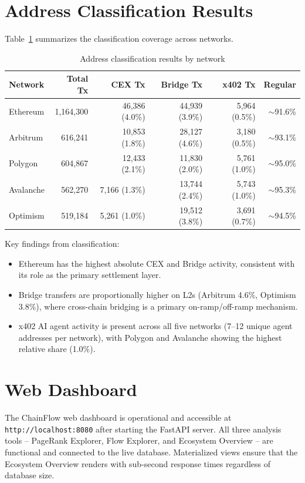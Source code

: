 \documentclass[a4paper,12pt]{report}
\begin{document}
\section{Address Classification Results}

Table~\ref{tab:classification} summarizes the classification coverage across networks.

\begin{table}[H]
\centering
\caption{Address classification results by network}
\label{tab:classification}
\begin{tabular}{|l|r|r|r|r|r|}
\hline
\textbf{Network} & \textbf{Total Tx} & \textbf{CEX Tx} & \textbf{Bridge Tx} & \textbf{x402 Tx} & \textbf{Regular} \\\hline
Ethereum  & 1,164,300 & 46,386 (4.0\%) & 44,939 (3.9\%) & 5,964 (0.5\%) & $\sim$91.6\% \\\hline
Arbitrum  &   616,241 & 10,853 (1.8\%) & 28,127 (4.6\%) & 3,180 (0.5\%) & $\sim$93.1\% \\\hline
Polygon   &   604,867 & 12,433 (2.1\%) & 11,830 (2.0\%) & 5,761 (1.0\%) & $\sim$95.0\% \\\hline
Avalanche &   562,270 &  7,166 (1.3\%) & 13,744 (2.4\%) & 5,743 (1.0\%) & $\sim$95.3\% \\\hline
Optimism  &   519,184 &  5,261 (1.0\%) & 19,512 (3.8\%) & 3,691 (0.7\%) & $\sim$94.5\% \\\hline
\end{tabular}
\end{table}

Key findings from classification:
\begin{itemize}
\item Ethereum has the highest absolute CEX and Bridge activity, consistent with its role as the
primary settlement layer.
\item Bridge transfers are proportionally higher on L2s (Arbitrum 4.6\%, Optimism 3.8\%), where
cross-chain bridging is a primary on-ramp/off-ramp mechanism.
\item x402 AI agent activity is present across all five networks (7--12 unique agent addresses
per network), with Polygon and Avalanche showing the highest relative share (1.0\%).
\end{itemize}

\section{Web Dashboard}

The ChainFlow web dashboard is operational and accessible at \texttt{http://localhost:8080}
after starting the FastAPI server. All three analysis tools -- PageRank Explorer, Flow Explorer,
and Ecosystem Overview -- are functional and connected to the live database. Materialized views
ensure that the Ecosystem Overview renders with sub-second response times regardless of
database size.
\end{document}
